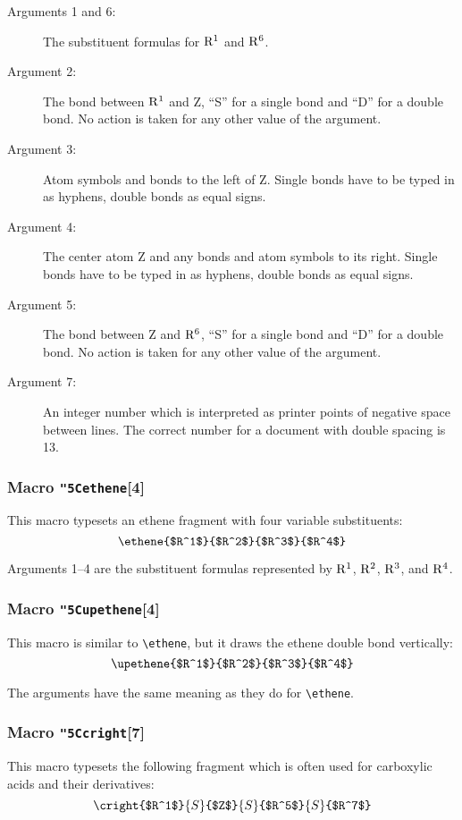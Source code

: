  \begin{description}
  \item[{\rm Arguments 1 and 6:}] The substituent formulas
       for ${\rm R^1}$ and ${\rm R^6}$.
  \item[{\rm Argument 2:}] The bond between ${\rm R^1}$
       and Z, ``S'' for a single bond and ``D'' for a double
       bond. No action is taken for any other value of the
       argument.
  \item[{\rm  Argument 3:}] Atom symbols and bonds to the
       left of Z. Single bonds have to be typed in as hyphens,
       double bonds as equal signs.
  \item[{\rm Argument 4:}] The center atom Z and any
       bonds and atom symbols to its right. Single bonds have to
       be typed in as hyphens, double bonds as equal signs.
  \item[{\rm Argument 5:}] The bond between Z and
       ${\rm R^6}$, ``S'' for a single bond and ``D'' for
       a double bond. No action is taken for any other value
       of the argument.
  \item[{\rm Argument 7:}] An integer number which is interpreted
       as printer points of negative space between lines.
       The correct number for a document with double spacing
       is 13.
 \end{description}
 
\subsubsection{Macro {\tt\char"5C{}ethene}[4]}
   This macro typesets an ethene fragment with four variable
 substituents:
 \[ \ethene{$R^1$}{$R^2$}{$R^3$}{$R^4$} \]
 
 Arguments 1--4 are the substituent formulas represented by
 ${\rm R^1}$, ${\rm R^2}$, ${\rm R^3}$, and ${\rm R^4}$.
 
\subsubsection{Macro {\tt\char"5C{}upethene}[4]}
   This macro is similar to \verb+\ethene+, but it draws
 the ethene double bond vertically:
 \[ \upethene{$R^1$}{$R^2$}{$R^3$}{$R^4$} \]
 
 The arguments have the same meaning as they do for
 \verb+\ethene+.
 
 \subsubsection{Macro {\tt\char"5C{}cright}[7]}
  This macro typesets the following fragment which is
 often used for carboxylic acids and their derivatives:
 \[ \cright{$R^1$}{S}{$Z$}{S}{$R^5$}{S}{$R^7$}  \]
 
